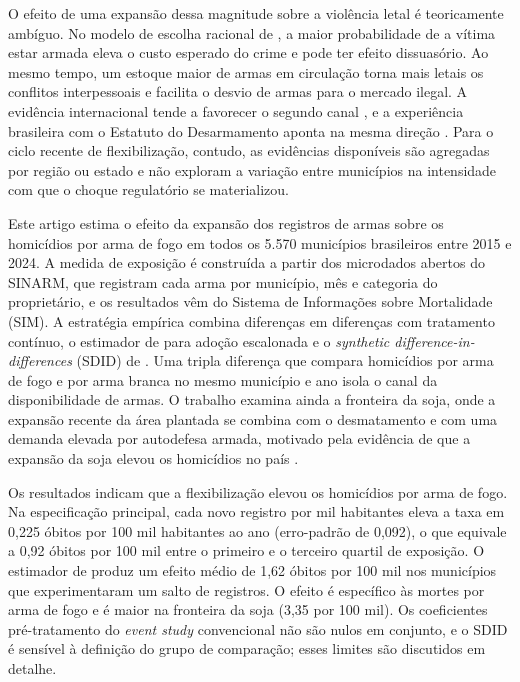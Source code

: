 \documentclass[11pt,a4paper]{article}
\begin{document}
O efeito de uma expansão dessa magnitude sobre a violência letal é teoricamente ambíguo. No modelo de escolha racional de \citet{becker1968}, a maior probabilidade de a vítima estar armada eleva o custo esperado do crime e pode ter efeito dissuasório. Ao mesmo tempo, um estoque maior de armas em circulação torna mais letais os conflitos interpessoais e facilita o desvio de armas para o mercado ilegal. A evidência internacional tende a favorecer o segundo canal \citep{duggan2001,cook2006}, e a experiência brasileira com o Estatuto do Desarmamento aponta na mesma direção \citep{souza2007,cerqueira2012}. Para o ciclo recente de flexibilização, contudo, as evidências disponíveis são agregadas por região ou estado \citep{baculi2021,wakim2025} e não exploram a variação entre municípios na intensidade com que o choque regulatório se materializou.

Este artigo estima o efeito da expansão dos registros de armas sobre os homicídios por arma de fogo em todos os 5.570 municípios brasileiros entre 2015 e 2024. A medida de exposição é construída a partir dos microdados abertos do SINARM, que registram cada arma por município, mês e categoria do proprietário, e os resultados vêm do Sistema de Informações sobre Mortalidade (SIM). A estratégia empírica combina diferenças em diferenças com tratamento contínuo, o estimador de \citet{callaway2021} para adoção escalonada e o \textit{synthetic difference-in-differences} (SDID) de \citet{arkhangelsky2021}. Uma tripla diferença que compara homicídios por arma de fogo e por arma branca no mesmo município e ano isola o canal da disponibilidade de armas. O trabalho examina ainda a fronteira da soja, onde a expansão recente da área plantada se combina com o desmatamento e com uma demanda elevada por autodefesa armada, motivado pela evidência de que a expansão da soja elevou os homicídios no país \citep{moreno2024}.

Os resultados indicam que a flexibilização elevou os homicídios por arma de fogo. Na especificação principal, cada novo registro por mil habitantes eleva a taxa em 0{,}225 óbitos por 100 mil habitantes ao ano (erro-padrão de 0{,}092), o que equivale a 0{,}92 óbitos por 100 mil entre o primeiro e o terceiro quartil de exposição. O estimador de \citet{callaway2021} produz um efeito médio de 1{,}62 óbitos por 100 mil nos municípios que experimentaram um salto de registros. O efeito é específico às mortes por arma de fogo e é maior na fronteira da soja (3{,}35 por 100 mil). Os coeficientes pré-tratamento do \textit{event study} convencional não são nulos em conjunto, e o SDID é sensível à definição do grupo de comparação; esses limites são discutidos em detalhe.
\end{document}
